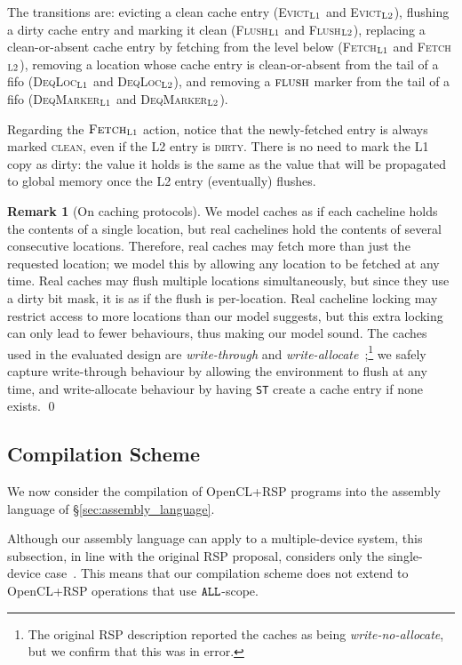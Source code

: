 \documentclass[svgnames,10pt]{sigplanconf}
\theoremstyle{definition}
\newtheorem{remark}{Remark}
\newenvironment{Remark}{\begin{remark}}{\qed\end{remark}}
\newcommand\sall{{\tt ALL}}
\newcommand\DIRTY{\textsc{dirty}}
\newcommand\CLEAN{\textsc{clean}}
\newcommand\INSst{\texttt{ST}}
\newcommand\ACTevict[1]{\textsc{Evict$_{\textsc{L#1}}$}}
\newcommand\ACTflush[1]{\textsc{Flush$_{\textsc{L#1}}$}}
\newcommand\ACTfetch[1]{\textsc{Fetch$_{\textsc{L#1}}$}}
\newcommand\ACTdeqaddr[1]{\textsc{DeqLoc$_{\textsc{L#1}}$}}
\newcommand\ACTdeqmarker[1]{\textsc{DeqMarker$_{\textsc{L#1}}$}}
\begin{document}
The transitions are: evicting a clean cache entry (\ACTevict1 and
\ACTevict2), flushing a dirty cache entry and marking it clean
(\ACTflush1 and \ACTflush2), replacing a clean-or-absent cache
entry by fetching from the level below (\ACTfetch1 and \ACTfetch2),
removing a location whose cache entry is clean-or-absent from the tail
of a fifo (\ACTdeqaddr1 and \ACTdeqaddr2), and removing a
$\textsc{flush}$ marker from the tail of a fifo (\ACTdeqmarker1 and
\ACTdeqmarker2).

Regarding the $\ACTfetch1$ action, notice that the
newly-fetched entry is always marked \CLEAN, even if the L2 entry is
\DIRTY. There is no need to mark the L1 copy as dirty: the value
it holds is the same as the value that will be propagated to global
memory once the L2 entry (eventually) flushes.


\begin{Remark}[On caching protocols] 
\label{rem:caching_protocols}
%
We model caches as if each cacheline holds the contents of a single
location, but real cachelines hold the contents of several consecutive
locations. Therefore, real caches may fetch more than just the
requested location; we model this by allowing any location to be fetched
at any time. Real caches may flush multiple locations simultaneously,
but since they use a dirty bit mask, it is as if the flush is
per-location. Real cacheline locking may restrict access to more
locations than our model suggests, but this extra locking can only
lead to fewer behaviours, thus making our model sound. The caches used
in the evaluated design are \emph{write-through} and
\emph{write-allocate}~\cite[Tab.~1]{orr+15};\footnote{The original RSP description reported the caches as being \emph{write-no-allocate}, but we
confirm that this was in error.} we safely capture
write-through behaviour by allowing the environment to flush at any
time, and write-allocate behaviour by having \INSst{} create a cache
entry if none exists.
%
\end{Remark}

\subsection{Compilation Scheme}
\label{sec:compilation_scheme}

We now consider the compilation of OpenCL+RSP programs into the
assembly language of \S\ref{sec:assembly_language}. 

Although our assembly language can apply to a multiple-device system,
this subsection, in line with the original RSP proposal, considers
only the single-device case~\cite[\S5]{orr+15}. This means that our
compilation scheme does not extend to OpenCL+RSP operations that use $\sall$-scope.
\end{document}
